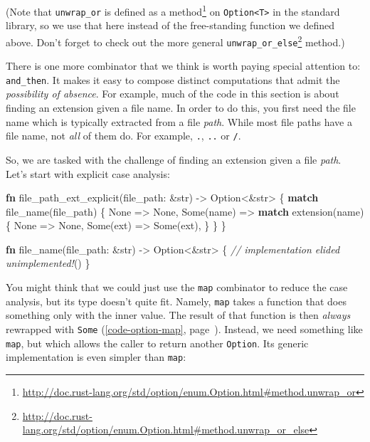 \documentclass[a4paper,]{book}
\renewcommand*{\hyperref}[2][\ar]{%
  \def\ar{#2}%
  #2 (\autoref{#1}, page~\pageref{#1})}
\newenvironment{Shaded}{\begin{snugshade}}{\end{snugshade}}
\newcommand{\KeywordTok}[1]{\textcolor[rgb]{0.13,0.29,0.53}{\textbf{{#1}}}}
\newcommand{\DataTypeTok}[1]{\textcolor[rgb]{0.13,0.29,0.53}{{#1}}}
\newcommand{\ConstantTok}[1]{\textcolor[rgb]{0.00,0.00,0.00}{{#1}}}
\newcommand{\CommentTok}[1]{\textcolor[rgb]{0.56,0.35,0.01}{\textit{{#1}}}}
\newcommand{\PreprocessorTok}[1]{\textcolor[rgb]{0.56,0.35,0.01}{\textit{{#1}}}}
\newcommand{\NormalTok}[1]{{#1}}
\renewcommand{\href}[2]{#2\footnote{\url{#1}}}
\begin{document}
(Note that \texttt{unwrap\_or} is
\href{http://doc.rust-lang.org/std/option/enum.Option.html\#method.unwrap_or}{defined
as a method} on \texttt{Option\textless{}T\textgreater{}} in the
standard library, so we use that here instead of the free-standing
function we defined above. Don't forget to check out the more general
\href{http://doc.rust-lang.org/std/option/enum.Option.html\#method.unwrap_or_else}{\texttt{unwrap\_or\_else}}
method.)

There is one more combinator that we think is worth paying special
attention to: \texttt{and\_then}. It makes it easy to compose distinct
computations that admit the \emph{possibility of absence}. For example,
much of the code in this section is about finding an extension given a
file name. In order to do this, you first need the file name which is
typically extracted from a file \emph{path}. While most file paths have
a file name, not \emph{all} of them do. For example, \texttt{.},
\texttt{..} or \texttt{/}.

So, we are tasked with the challenge of finding an extension given a
file \emph{path}. Let's start with explicit case analysis:

\begin{Shaded}
\begin{Highlighting}[]
\KeywordTok{fn} \NormalTok{file_path_ext_explicit(file_path: &}\DataTypeTok{str}\NormalTok{) -> }\DataTypeTok{Option}\NormalTok{<&}\DataTypeTok{str}\NormalTok{> \{}
    \KeywordTok{match} \NormalTok{file_name(file_path) \{}
        \ConstantTok{None} \NormalTok{=> }\ConstantTok{None}\NormalTok{,}
        \ConstantTok{Some}\NormalTok{(name) => }\KeywordTok{match} \NormalTok{extension(name) \{}
            \ConstantTok{None} \NormalTok{=> }\ConstantTok{None}\NormalTok{,}
            \ConstantTok{Some}\NormalTok{(ext) => }\ConstantTok{Some}\NormalTok{(ext),}
        \NormalTok{\}}
    \NormalTok{\}}
\NormalTok{\}}

\KeywordTok{fn} \NormalTok{file_name(file_path: &}\DataTypeTok{str}\NormalTok{) -> }\DataTypeTok{Option}\NormalTok{<&}\DataTypeTok{str}\NormalTok{> \{}
  \CommentTok{// implementation elided}
  \PreprocessorTok{unimplemented!}\NormalTok{()}
\NormalTok{\}}
\end{Highlighting}
\end{Shaded}

You might think that we could just use the \texttt{map} combinator to
reduce the case analysis, but its type doesn't quite fit. Namely,
\texttt{map} takes a function that does something only with the inner
value. The result of that function is then \emph{always}
\hyperref[code-option-map]{rewrapped with \texttt{Some}}. Instead, we
need something like \texttt{map}, but which allows the caller to return
another \texttt{Option}. Its generic implementation is even simpler than
\texttt{map}:
\end{document}
